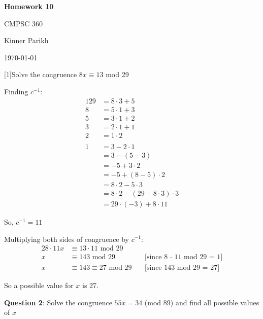 \documentclass{article} %
\newcommand{\question}[2][]{\begin{flushleft}
        \textbf{Question #1}: #2

\end{flushleft}}
\newcommand{\maketitletwo}[2][]{\begin{center}
        \Large{\textbf{Homework #1}
            
            CMPSC 360} %
        \vspace{5pt}
        
        \normalsize{Kinner Parikh  %
        
        \today}        %
        \vspace{15pt}
        
\end{center}}
\begin{document}
    \maketitletwo[10]  %
    
    \question[1]{Solve the congruence $8x \equiv 13$ mod 29}

    Finding $c^{-1}:$
    \begin{alignat*}{1}
        29 &= 8 \cdot 3 + 5\\
        8  &= 5 \cdot 1 + 3\\
        5  &= 3 \cdot 1 + 2\\
        3  &= 2 \cdot 1 + 1\\
        2  &= 1 \cdot 2\\
        \\
        1 &= 3 - 2 \cdot 1\\
          &= 3 - (5 - 3)\\
          &= -5 + 3 \cdot 2\\
          &= -5 + (8 - 5) \cdot 2\\
          &= 8 \cdot 2 - 5 \cdot 3\\
          &= 8 \cdot 2 - (29 - 8 \cdot 3) \cdot 3\\
          &= 29 \cdot (-3) + 8 \cdot 11
    \end{alignat*}

    So, $c^{-1} = 11$

    Multiplying both sides of congruence by $c^{-1}$:
    \begin{alignat*}{2}
        8 \cdot 11x &\equiv 13 \cdot 11 \text{ mod } 29\ \\
        x &\equiv 143 \text{ mod } 29 && \text{[since 8 $\cdot$ 11 mod 29 = 1]}\\
        x &\equiv 143 \equiv 27 \text{ mod } 29\ && \text{[since 143 mod 29 = 27]}
    \end{alignat*}

    So a possible value for $x$ is 27.

    \newpage

    \question[2]{Solve the congruence $55x = 34$ (mod 89) and find all possible values of $x$}
\end{document}
